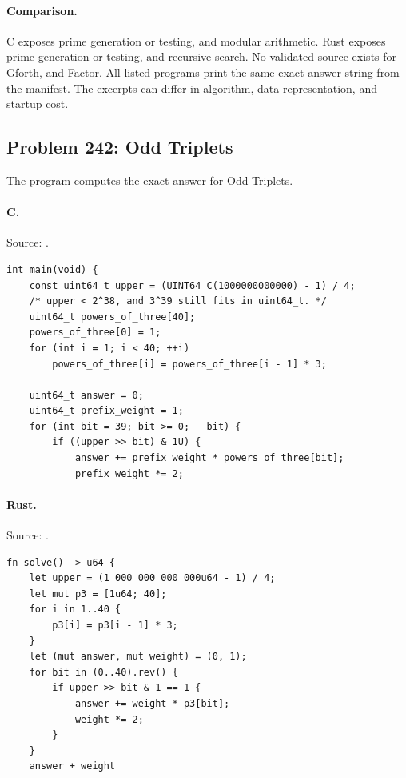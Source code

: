 \paragraph{Comparison.}
C exposes prime generation or testing, and modular arithmetic. Rust exposes prime generation or testing, and recursive search.
No validated source exists for Gforth, and Factor.
All listed programs print the same exact answer string from the manifest. The excerpts can differ in algorithm, data representation, and startup cost.

\subsection{Problem 242: Odd Triplets}
\label{walkthrough:p242}
The program computes the exact answer for Odd Triplets.

\paragraph{C.} Source: .
\begin{lstlisting}
int main(void) {
    const uint64_t upper = (UINT64_C(1000000000000) - 1) / 4;
    /* upper < 2^38, and 3^39 still fits in uint64_t. */
    uint64_t powers_of_three[40];
    powers_of_three[0] = 1;
    for (int i = 1; i < 40; ++i)
        powers_of_three[i] = powers_of_three[i - 1] * 3;

    uint64_t answer = 0;
    uint64_t prefix_weight = 1;
    for (int bit = 39; bit >= 0; --bit) {
        if ((upper >> bit) & 1U) {
            answer += prefix_weight * powers_of_three[bit];
            prefix_weight *= 2;
\end{lstlisting}

\paragraph{Rust.} Source: .
\begin{lstlisting}
fn solve() -> u64 {
    let upper = (1_000_000_000_000u64 - 1) / 4;
    let mut p3 = [1u64; 40];
    for i in 1..40 {
        p3[i] = p3[i - 1] * 3;
    }
    let (mut answer, mut weight) = (0, 1);
    for bit in (0..40).rev() {
        if upper >> bit & 1 == 1 {
            answer += weight * p3[bit];
            weight *= 2;
        }
    }
    answer + weight
\end{lstlisting}

